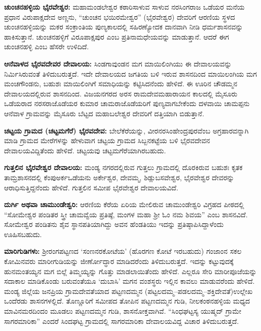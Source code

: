 \textbf{ಚುಂಚನಹಳ್ಳಿಯ ಭೈರವೇಶ್ವರ:} ಮಹಾಮಂಡಲೇಶ್ವರ ಕಠಾರಿಸಾಳುವ ಸಾಳುವ ನರಸಿಂಗರಾಜ ಒಡೆಯರ ಮನೆಯ ಪ್ರಧಾನ ವಿರುಪಾಕ್ಷದೇವ ಅಣ್ಣನು, “ಚುಂಚನ ಭಯಿರಮೇಶ್ವರ” (ಭೈರವೇಶ್ವರ) ದೇವರಿಗೆ ಆರಣಿಯ ಸ್ಥಳದ ಚುಂಚನಹಳ್ಳಿಯನ್ನು ಮಕರ ಸಂಕ್ರಾಂತಿಯ ಪುಣ್ಯಕಾಲದಲ್ಲಿ ಸಹಿರಣ್ಯೋದಕ ದಾನವಾಗಿ ನೀಡಿ ಧರ್ಮಶಾಸನವನ್ನು ಹಾಕಿಸುತ್ತಾನೆ. ಚುಂಚನಹಳ್ಳಿಗೆ ವಿರೂಪಾಕ್ಷಪುರ ಎಂಬ ಪ್ರತಿನಾಮಧೇಯವನ್ನು ಮಾಡುತ್ತಾನೆ. ಆದರೆ ಈಗ ಚುಂಚನಹಳ್ಳಿ ಎಂಬ ಹೆಸರೇ ಉಳಿದಿದೆ.

\textbf{ಆನೆವಾಳದ ಭೈರವದೇವರ ದೇವಾಲಯ: }ಸಿಂಡಗಾವುಂಡನ ಮಗ ಮಾಯಿಲಿಂಗಿಯು ಈ ದೇವಾಲಯವನ್ನು ನಿರ್ಮಿಸಿರುವಂತೆ ತಿಳಿದುಬರುತ್ತದೆ. ಇದೇ ದೇವಾಲಯದ ಜಗತಿಯ ಬಳಿ ಇರುವ ಶಾಸನದಿಂದ ಮಾಯಿಲಂಗಿಯ ಮಗ ಮಂಚಗೌಂಡನು, ಬಹುಶಃ ಮಾಯಿಲಿಂಗಿಗೆ ಸಮಾಧಿಯನ್ನು ಕಟ್ಟಿಸಿದನೆಂದು ಹೇಳಿದೆ. ಈ ಊರಿನ ಚೌಡಮ್ಮನ ದೇವಾಲಯದಲ್ಲಿರುವ ಶಾಸನದಿಂದ. ವಿಜಯನಗರದ ಅರಸ ರಾಮದೇವಮಹಾರಾಯನ ಕಾಲದಲ್ಲಿ ಮೈಸೂರು ಒಡೆಯರಾದ ನರಸರಾಜೊಡೆಯರ ಕುಮಾರ ಚಾಮರಾಜೊಡೆಯರಿಗೆ ಪುಣ್ಯವಾಗಬೇಕೆಂದು ದಳವಾಯಿ ಚಾಮಪ್ಪನು ಆನೆವಾಳ ಗ್ರಾಮವನ್ನು ಮೈಸೂರು ಬೆಟ್ಟದ ಮಹಾಬಲೇಶ್ವರ ದೇವರಿಗೆ ದತ್ತಿಯಾಗಿ ಬಿಡುತ್ತಾನೆ.

\textbf{ಚಟ್ಟಯ ಗ್ರಾಮದ (ಚಟ್ಟಮಗೆರೆ) ಭೈರವದೇವ:} ಬೇಲೆಕೆರೆಯನ್ನು, ವೀರನರಸಿಂಹೇಂದ್ರಪುರವೆಂಬ ಅಗ್ರಹಾರವನ್ನಾಗಿ ಮಾಡಿ ಗ್ರಾಮದ ಮೇರೆಗಳನ್ನು ಹೇಳುವಾಗ ಚಟ್ಟಯ ಗ್ರಾಮದ ಸಿಬ್ಬನಕಟ್ಟೆಯ ಬಳಿ ಭೈರವದೇವನ ದೇವಾಲಯವಿದ್ದಿತೆಂದು ಹೇಳಿದೆ. ಚಟ್ಟಯವು ಚಟ್ಟಮಗೆರೆಯಾಗಿರಬಹುದು. 

\textbf{ಗುತ್ತಲಿನ ಭೈರವೇಶ್ವರ ದೇವಾಲಯ:} ಮಂಡ್ಯ ನಗರದಲ್ಲಿರುವ ಗುತ್ತಲು ಗ್ರಾಮದಲ್ಲಿ ದೊರಕಿರುವ ಬಹುಶಃ ಕೃತಕ ತಾಮ್ರಶಾಸನದಲ್ಲಿ ಕೆಂಪುಅರ್ಕಒಡೆಯನು ಅರ್ಕೇಶ್ವರ, ದೇವಮ್ಮ, ಶಿಡ್ಲುಬಸವೇಶ್ವರ, ಭೈರವೇಶ್ವರ ದೇವರನ್ನು ಆರಾಧಿಸುತ್ತಿದ್ದನೆಂದು ಹೇಳಿದೆ. ಗುತ್ತಲಿನ ಸಮೀಪ ಭೈರವೇಶ್ವರ ದೇವಾಲಯವಿದೆ.

\textbf{ದುರ್ಗಿ ಅಥವಾ ಚಾಮುಂಡೇಶ್ವರಿ:} ಆರಣಿಯ ಕೆರೆಯ ಏರಿಯ ಮೇಲಿರುವ ಚಾಮುಂಡೇಶ್ವರಿ ವಿಗ್ರಹದ ಪೀಠದಲ್ಲಿ “ಸೋಮೇಶ್ವರ ಪಂಡಿತರ ಸ್ತ್ರೀ ಚಾಮವ್ವೆಯ ಪ್ರತಿಷ್ಠೆ, ಮಂಗಳ ಮಹಾ ಶ‍್ರೀ ಓಂ ನಮ ಶಿವಯ” ಎಂಬ ಶಾಸನವಿದೆ. ಸೋಮೇಶ್ವರ ಪಂಡಿತನು ಶೈವ ಸ್ಥಾನಪತಿಯಾಗಿದ್ದು ಅವನ ಹೆಂಡತಿಯು ಇದನ್ನು ಪ್ರತಿಷ್ಠಾಪಿಸಿದ್ದಾಳೆಂದು ಊಹಿಸಬಹುದು.

\textbf{ಮಾರಿಗುಡಿಗಳು:} ಶ‍್ರೀರಂಗಪಟ್ಟಣದ ‘ಸಂಣನರಕೋಟೆಯ’ (ಹೊರಗಣ ಕೋಟೆ ಇರಬಹುದು) ಗಂಜಾಂನ ಸಕಲ ಕೋಮಿನವರು ಮಾರೀಗುಡಿಯನ್ನು ಜೀರ್ಣೋದ್ಧಾರ ಮಾಡಿದರೆಂದು ತಿಳಿದುಬರುತ್ತದೆ. ಇದನ್ನು ಕಟ್ಟುವುದಕ್ಕೆ ಹುನಮಂತಯ್ಯನ ಮಗ ಬಿಲ್ಲೆ ತಿಮ್ಮಯ್ಯನ್ನು ಗೊತ್ತು ಮಾಡಲಾಯಿತೆಂದು ಹೇಳಿದೆ. ಎಲ್ಲರೂ ಸೇರಿ ಮಾರೀಪೂಜೆಯನ್ನು ಸದಾಕಾಲ ಮಾಡಿಕೊಂಡು ಬರುವಂತೆಯೂ ‘ದುಬಾಸಿ’ ಮಗನ ವಂಶಸ್ಥರು ಇಲ್ಲಿನ ಕಾವಲು ಮಾಡುವರೆಂದು ಹೇಳಿದೆ. ಮಂಡ್ಯ ಜಿಲ್ಲೆಯ ಜನಪ್ರಿಯ ಗ್ರಾಮದೇವತೆಯಾದ ಪಟ್ಟಣದಮ್ಮನ (ಪಟ್ಟಲದಮ್ಮ–ಪಡಲದಮ್ಮ–ಶಕ್ತಿದೇವತೆ)ಉಲ್ಲೇಖ ಒಂದೆರಡು ಶಾಸನಗಳಲ್ಲಿದೆ. ತೊಣ್ಣೂರಿಗೆ ಸಮೀಪದ ತೋಪಿನ ಪಟ್ಟಣದಮ್ಮನ ಗುಡಿ, ನೀಲಕಂಠನಹಳ್ಳಿಯ ಮಧ್ಯದ ಮಾವಿನಮರದಿಂದಂ ಮೂಡಲು ಪಟ್ಟಣದಮ್ಮನ ಗುಡಿ, ಶಾಸನೋಕ್ತವಾಗಿವೆ. “ಸಿಂಧಘಟ್ಟಸ್ಯ ಯುಷ್ಮದ್​ ಗ್ರಾಮೇ ಸಾಗರಮಾರಿಕಾ” ಎಂದರೆ ಸಿಂದಘಟ್ಟ ಗ್ರಾಮದಲ್ಲಿ ಸಾಗರಮಾರಿಕಾ ದೇವಾಲಯವಿದ್ದ ವಿಚಾರ ತಿಳಿದುಬರುತ್ತದೆ.

